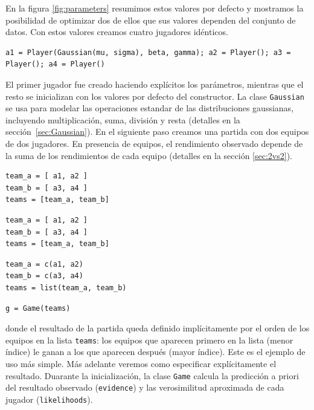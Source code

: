 \documentclass[a4paper,11pt]{book}
\theoremstyle{definition}
\begin{document}
%
En la figura \ref{fig:parameters} resumimos estos valores por defecto y mostramos la posibilidad de optimizar dos de ellos que sus valores dependen del conjunto de datos.
%
Con estos valores creamos cuatro jugadores idénticos.
%
\begin{lstlisting}[captionpos=b,backgroundcolor=\color{all},label=lst:player, caption={Inicialización de los jugadores}, belowskip=0cm]
a1 = Player(Gaussian(mu, sigma), beta, gamma); a2 = Player(); a3 = Player(); a4 = Player()
\end{lstlisting}
%
El primer jugador fue creado haciendo explícitos los parámetros, mientras que el resto se inicializan con los valores por defecto del constructor.
%
La clase \texttt{Gaussian} se usa para modelar las operaciones estandar de las distribuciones gaussianas, incluyendo multiplicación, suma, división y resta (detalles en la sección~\ref{sec:Gaussian}).
%
En el siguiente paso creamos una partida con dos equipos de dos jugadores.
%
En presencia de equipos, el rendimiento observado depende de la suma de los rendimientos de cada equipo (detalles en la sección \ref{sec:2vs2}).
%
\begin{paracol}{3}
\begin{lstlisting}[backgroundcolor=\color{julia!60}, belowskip=0cm]
team_a = [ a1, a2 ]
team_b = [ a3, a4 ]
teams = [team_a, team_b]
\end{lstlisting}
  \switchcolumn
\begin{lstlisting}[backgroundcolor=\color{python!60}, belowskip=0cm]
team_a = [ a1, a2 ]
team_b = [ a3, a4 ]
teams = [team_a, team_b]
\end{lstlisting}
   \switchcolumn
\begin{lstlisting}[backgroundcolor=\color{r!50}, belowskip=0cm]
team_a = c(a1, a2)
team_b = c(a3, a4)
teams = list(team_a, team_b)
\end{lstlisting}
\end{paracol}
\begin{lstlisting}[captionpos=b,backgroundcolor=\color{all},label=lst:game,caption={Equipos e inicialización del juego}, aboveskip=0cm,belowskip=0cm]
g = Game(teams)
\end{lstlisting}
%
donde el resultado de la partida queda definido implícitamente por el orden de los equipos en la lista \texttt{teams}: los equipos que aparecen primero en la lista (menor índice) le ganan a los que aparecen después (mayor índice).
%
Este es el ejemplo de uso más simple.
%
Más adelante veremos como especificar explícitamente el resultado.
%
Duarante la inicialización, la clase \texttt{Game} calcula la predicción a priori del resultado observado (\texttt{evidence}) y las verosimilitud aproximada de cada jugador (\texttt{likelihoods}).
\end{document}
